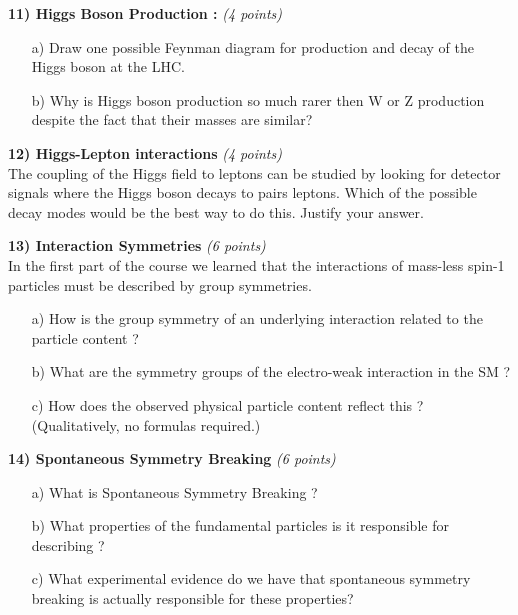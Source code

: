 {\clearpage

\textbf{11) Higgs Boson Production : } \hfill \textit{(4 points)}\\
\begin{itemize}
\item[a)]{ Draw one possible Feynman diagram for production and decay of the Higgs boson at the LHC.}
\item[b)]{ Why is Higgs boson production so much rarer then W or Z production despite the fact that their masses are similar?    }
\end{itemize}

\vspace*{0.5in}


\textbf{12) Higgs-Lepton interactions } \hfill \textit{(4 points)}\\
The coupling of the Higgs field to leptons can be studied by looking for detector signals where the Higgs boson decays to pairs leptons.
Which of the possible decay modes would be the best way to do this.  Justify your answer.

\vspace*{0.5in}

\textbf{13) Interaction Symmetries } \hfill \textit{(6 points)} \\ 
In the first part of the course we learned that the interactions of mass-less spin-1 particles must be described by group symmetries. 
\begin{itemize}
\item[a)]{How is the group symmetry of an underlying interaction related to the particle content ?}
\item[b)]{What are the symmetry groups of the electro-weak interaction in the SM ? }
\item[c)]{How does the observed physical particle content reflect this ? (Qualitatively, no formulas required.) }
\end{itemize}

\vspace*{0.5in}

\textbf{14) Spontaneous Symmetry Breaking} \hfill \textit{(6 points)} \\ 
\begin{itemize}
\item[a)]{What is Spontaneous Symmetry Breaking  ?  }
\item[b)]{What properties of the fundamental particles is it responsible for describing ?}
\item[c)]{What experimental evidence do we have that spontaneous symmetry breaking is actually responsible for these properties?}
\end{itemize}



} %

